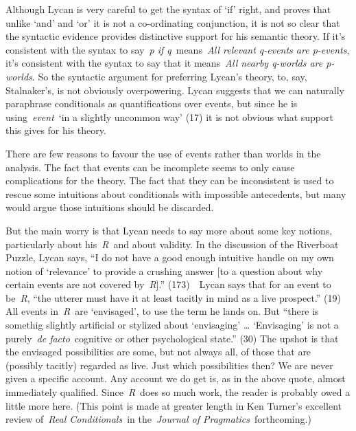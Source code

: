 \documentclass[
  10pt,
  letterpaper,
  DIV=11,
  numbers=noendperiod,
  twoside]{scrartcl}
\begin{document}
Although Lycan is very careful to get the syntax of `if' right, and
proves that unlike `and' and `or' it is not a co-ordinating conjunction,
it is not so clear that the syntactic evidence provides distinctive
support for his semantic theory. If it's consistent with the syntax to
say~\emph{p if q}~means~\emph{All relevant q-events are p-events}, it's
consistent with the syntax to say that it means~\emph{All nearby
q-worlds are p-worlds}. So the syntactic argument for preferring Lycan's
theory, to, say, Stalnaker's, is not obviously overpowering. Lycan
suggests that we can naturally paraphrase conditionals as
quantifications over events, but since he is using~\emph{event}~`in a
slightly uncommon way' (17) it is not obvious what support this gives
for his theory.

There are few reasons to favour the use of events rather than worlds in
the analysis. The fact that events can be incomplete seems to only cause
complications for the theory. The fact that they can be inconsistent is
used to rescue some intuitions about conditionals with impossible
antecedents, but many would argue those intuitions should be discarded.

But the main worry is that Lycan needs to say more about some key
notions, particularly about his~\emph{R}~and about validity. In the
discussion of the Riverboat Puzzle, Lycan says, ``I do not have a good
enough intuitive handle on my own notion of `relevance' to provide a
crushing answer {[}to a question about why certain events are not
covered by~\emph{R}{]}.'' (173)~~Lycan says that for an event to
be~\emph{R}, ``the utterer must have it at least tacitly in mind as a
live prospect.'' (19) All events in~\emph{R}~are `envisaged', to use the
term he lands on. But ``there is somethig slightly artificial or
stylized about `envisaging' \ldots{} `Envisaging' is not a
purely~\emph{de facto}~cognitive or other psychological state.'' (30)
The upshot is that the envisaged possibilities are some, but not always
all, of those that are (possibly tacitly) regarded as live. Just which
possibilities then? We are never given a specific account. Any account
we do get is, as in the above quote, almost immediately qualified.
Since~\emph{R}~does so much work, the reader is probably owed a little
more here. (This point is made at greater length in Ken Turner's
excellent review of~\emph{Real Conditionals}~in the~\emph{Journal of
Pragmatics}~forthcoming.)
\end{document}
